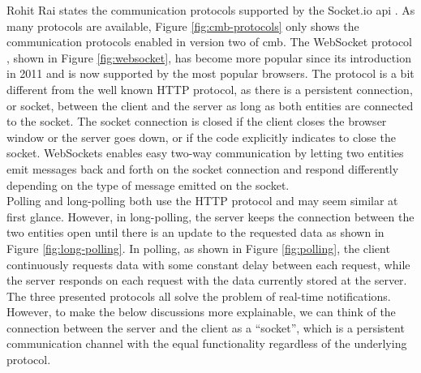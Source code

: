 Rohit Rai states the communication protocols supported by the Socket.io \gls{api} \cite{Rai2013}. As many protocols are available, Figure \ref{fig:cmb-protocols} only shows the communication protocols enabled in version two of \gls{cmb}. The WebSocket protocol \cite{a:Fette2011}, shown in Figure \ref{fig:websocket}, has become more popular since its introduction in 2011 and is now supported by the most popular browsers. The protocol is a bit different from the well known HTTP protocol, as there is a persistent connection, or socket, between the client and the server as long as both entities are connected to the socket. The socket connection is closed if the client closes the browser window or the server goes down, or if the code explicitly indicates to close the socket. WebSockets enables easy two-way communication by letting two entities emit messages back and forth on the socket connection and respond differently depending on the type of message emitted on the socket. \\

Polling and long-polling both use the HTTP protocol and may seem similar at first glance. However, in long-polling, the server keeps the connection between the two entities open until there is an update to the requested data as shown in Figure \ref{fig:long-polling}. In polling, as shown in Figure \ref{fig:polling}, the client continuously requests data with some constant delay between each request, while the server responds on each request with the data currently stored at the server. The three presented protocols all solve the problem of real-time notifications. However, to make the below discussions more explainable, we can think of the connection between the server and the client as a ``socket'', which is a persistent communication channel with the equal functionality regardless of the underlying protocol. \\

